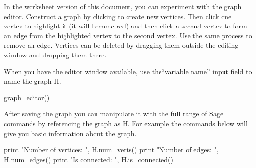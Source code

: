 \documentclass{article}
\begin{document}
In the worksheet version of this document, you can experiment with the graph editor.  Construct a graph by clicking to create new vertices.  Then click one vertex to highlight it (it will become red) and then click a second vertex to form an edge from the highlighted vertex to the second vertex.  Use the same process to remove an edge.  Vertices can be deleted by dragging them outside the editing window and dropping them there.\par
%
When you have the editor window available, use the``variable name'' input field to name the graph H.

\begin{sageverbatim}
graph_editor()
\end{sageverbatim}

After saving the graph you can manipulate it with the full range of Sage commands by referencing the graph as H.  For example the commands below will give you basic information about the graph.

\begin{sageverbatim}
print "Number of vertices: ", H.num_verts()
print "Number of edges: ", H.num_edges()
print "Is connected: ", H.is_connected()
\end{sageverbatim}
\end{document}

